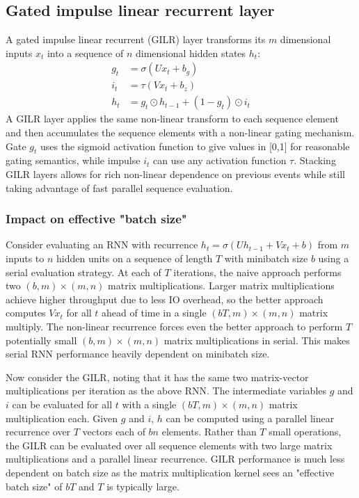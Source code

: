 \documentclass{article}
\begin{document}
\subsection{Gated impulse linear recurrent layer}
A gated impulse linear recurrent (GILR) layer transforms its $m$ dimensional inputs $x_t$ into a sequence of $n$ dimensional hidden states $h_t$:
\begin{align*}
g_t &= \sigma(Ux_t + b_g) \\
i_t &= \tau(Vx_t + b_z) \\
h_t &= g_t \odot h_{t-1} + (1-g_t)\odot i_t
\end{align*}
A GILR layer applies the same non-linear transform to each sequence element and
then accumulates the sequence elements with a non-linear gating mechanism. Gate
$g_t$ uses the sigmoid activation function to give values in [0,1] for
reasonable gating semantics, while impulse $i_t$ can use any activation function
$\tau$. Stacking GILR layers allows for rich non-linear dependence on previous
events while still taking advantage of fast parallel sequence evaluation.

\subsubsection{Impact on effective "batch size"}
Consider evaluating an RNN with recurrence $h_t = \sigma(Uh_{t-1} + Vx_t + b)$
from $m$ inputs to $n$ hidden units on a sequence of length $T$ with minibatch
size $b$ using a serial evaluation strategy. At each of $T$ iterations, the
naive approach performs two $(b, m) \times (m, n)$ matrix
multiplications. Larger matrix multiplications achieve higher throughput due to
less IO overhead, so the better approach computes $Vx_t$ for all $t$ ahead of
time in a single $(bT, m) \times (m, n)$ matrix multiply. The non-linear
recurrence forces even the better approach to perform $T$ potentially small $(b,
m) \times (m, n)$ matrix multiplications in serial. This makes serial RNN
performance heavily dependent on minibatch size.

Now consider the GILR, noting that it has the same two matrix-vector
multiplications per iteration as the above RNN. The intermediate variables $g$
and $i$ can be evaluated for all $t$ with a single $(bT, m) \times (m, n)$
matrix multiplication each. Given $g$ and $i$, $h$ can be computed using a
parallel linear recurrence over $T$ vectors each of $bn$ elements. Rather than
$T$ small operations, the GILR can be evaluated over all sequence elements with
two large matrix multiplications and a parallel linear recurrence. GILR performance
is much less dependent on batch size as the matrix multiplication kernel sees an "effective
batch size" of $bT$ and $T$ is typically large.
\end{document}
